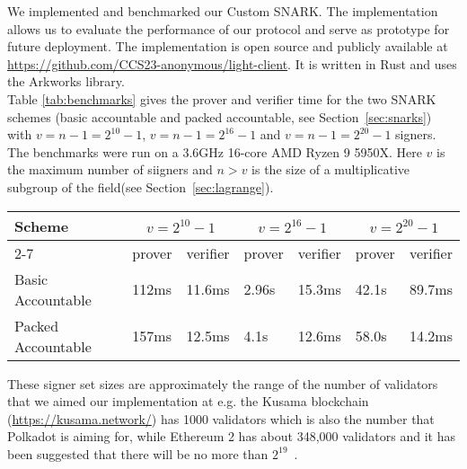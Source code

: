 \noindent We implemented and benchmarked our Custom SNARK. The implementation allows us to evaluate the performance of our protocol and serve as prototype for future deployment. The implementation 
is open source and publicly available at \url{https://github.com/CCS23-anonymous/light-client}. It is written in Rust and uses the Arkworks library. \\

\noindent Table \ref{tab:benchmarks} gives the prover and verifier time for the two SNARK schemes (basic accountable and  packed accountable, see Section~\ref{sec:snarks}) with $v = n-1 = 2^{10}-1$, $v = n-1 = 2^{16}-1$ 
and $v=n-1=2^{20}-1$ signers. The benchmarks were run on a 3.6GHz 16-core AMD Ryzen 9 5950X. Here $v$ is the maximum number of siigners and $n> v$ is the size of a multiplicative subgroup of the field(see Section~\ref{sec:lagrange}).\\

\begin{table*}[h!]
\hfill
\begin{tabular}{| l | l | l | l | l |l | l |}
\hline
 Scheme & \multicolumn{2}{|c|}{$v = 2^{10}-1$} & \multicolumn{2}{|c|}{$v = 2^{16}-1$} & \multicolumn{2}{|c|}{$v = 2^{20}-1$}     \\
\cline{2-7}
 &  prover & verifier & prover & verifier &  prover & verifier \\
\hline

Basic Accountable & 112ms & 11.6ms & 2.96s & 15.3ms & 42.1s & 89.7ms \\
Packed Accountable & 157ms & 12.5ms & 4.1s & 12.6ms & 58.0s & 14.2ms \\
\hline
\end{tabular}
\caption{Proof and verifier times for the different schemes and numbers of signers}
\label{tab:benchmarks}
\end{table*}

\noindent These signer set sizes are approximately the range of the number of validators that we aimed our implementation at e.g. the Kusama blockchain (\url{https://kusama.network/}) has 1000 validators which is also the number that Polkadot is aiming for, while Ethereum 2 has about 348,000 validators and it has been suggested that there will be no more than $2^{19}$~\cite{ethresearch1}. \\

